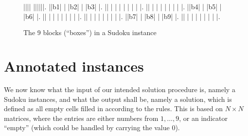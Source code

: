 \documentclass[11pt]{report}
\begin{document}
\begin{figure}[h]
\begin{sudoku}
 |{}|{}|{}| {}|{}|{}|{}|{}|{}|.
 |{}|{\LARGE b1}| | |{\LARGE b2}| | |{\LARGE b3}| |.
 |{}| | | | | | | | |.
 |{}| | | | | | | | |.
 |{}|{\LARGE b4}| | |{\LARGE b5}| | |{\LARGE b6}| |.
 |{}| | | | | | | | |.
 |{}| | | | | | | | |.
 |{}|{\LARGE b7}| | |{\LARGE b8}| | |{\LARGE b9}| |.
 |{}| | | | | | | | |.
\end{sudoku}
\caption{The 9 blocks (``boxes'') in a Sudoku instance}
\label{fig:exampleblock}
\end{figure}



\section{Annotated instances}
\label{sec:Annotatedinstances}

We now know what the input of our intended solution procedure is, namely a Sudoku instances, and what the output shall be, namely a solution, which is defined as all empty cells filled in according to the rules. This is based on $N \times N$ matrices, where the entries are either numbers from $1,\dots,9$, or an indicator ``empty'' (which could be handled by carrying the value $0$).
\end{document}
